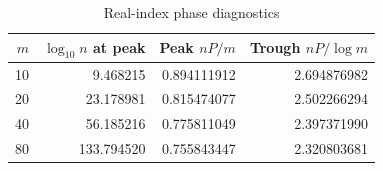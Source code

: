 \begin{table}[htbp]\centering
\caption{Real-index phase diagnostics}\label{tab:phase}
\begin{tabular}{r r r r}\toprule
$m$ & $\log_{10}n$ at peak & Peak $nP/m$ & Trough $nP/\log m$ \\\midrule
10 & 9.468215 & 0.894111912 & 2.694876982 \\
20 & 23.178981 & 0.815474077 & 2.502266294 \\
40 & 56.185216 & 0.775811049 & 2.397371990 \\
80 & 133.794520 & 0.755843447 & 2.320803681 \\
\bottomrule\end{tabular}\end{table}
